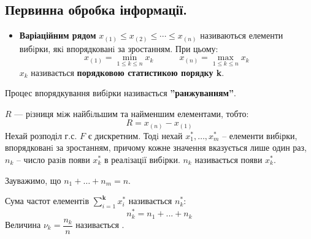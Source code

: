 \subsection{Первинна обробка інформації.}
\begin{itemize}
    \item \textbf{\color{javared}Варіаційним рядом} $x_{(1)} \leq x_{(2)} \leq \cdots \leq x_{(n)} $ називаються елементи вибiрки, якi
впорядкованi за зростанням. При цьому:
$$
x_{(1)} = \min\limits_{1 \leq k \leq n} x_k \qquad \quad x_{(n)} = \max\limits_{1 \leq k \leq n} x_k
$$
$x_k$ називається \textbf{\color{javadocblue}порядковою статистикою порядку k}.
\end{itemize}
Процес впорядкування вибiрки називається \textbf{\color{javadocblue}''ранжуванням''}.\par
{} $R$ --- рiзниця мiж найбiльшим та найменшим елементами, тобто:
$$
R = x_{(n)} - x_{(1)}
$$
Нехай розподіл г.с. $F$ є дискретним. Тодi нехай $x_1^* , \dots , x_m^*$ – елементи вибiрки, впорядкованi
за зростанням, причому кожне значення вказується лише один раз, $n_k$ – число разiв появи $x_k^*$ в реалiзацiї вибiрки.  $n_k$ називається  появи $x_k^*$.\par
Зауважимо, що $n_1 + \dots + n_m = n$.\par
Сума частот елементiв $ \displaystyle\sum\limits_{i = 1}^{ \textbf{k}}{x_i^*}$ називається  $n_k^*$:
$$
n_k^* = n_1 + ... + n_k
$$
Величина $\nu_k = \dfrac{n_k}{n}$ називається .
